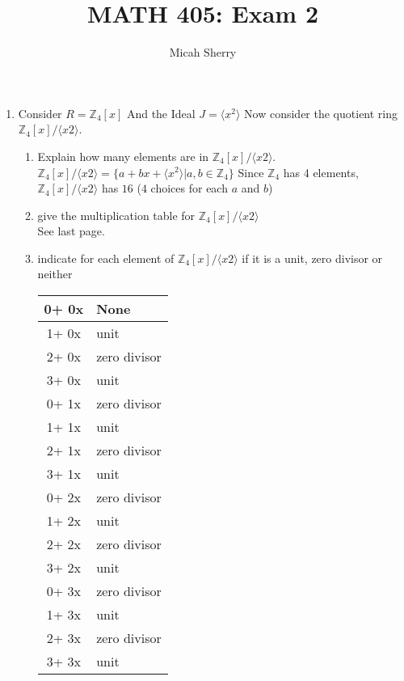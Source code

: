 \documentclass{article}
\title{MATH 405: Exam 2 }
\author{Micah Sherry}
\newcommand{\Z}{\mathbb{Z}}
\begin{document}
	\maketitle
	\begin{enumerate}
		\item Consider $R = \Z_4[x]$ And the Ideal $J= \langle x^2 \rangle$ Now consider the quotient ring $\Z_4[x] / \langle x2 \rangle$.
		\begin{enumerate}
			\item Explain how many elements are in $\Z_4[x] / \langle x2 \rangle$.\\
			$\Z_4[x] / \langle x2 \rangle = \{a+bx+\langle x^2\rangle| a,b \in \Z_4\}$ Since $\Z_4$ has 4 elements, $\Z_4[x] / \langle x2 \rangle$ has $16$ ($4$ choices for each $a$ and $b$)  
			\item  give the multiplication table for $\Z_4[x] / \langle x2 \rangle$\\
				See last page.  
			
			\item  indicate for each element of $\Z_4[x] / \langle x2 \rangle$ if it is a unit, zero divisor or neither 
			\begin{table}[h!] 
				\centering
				\begin{tabular}{|c|l|}
					\hline
					0+ 0x & None \\	\hline
					1+ 0x & unit \\	\hline
					2+ 0x & zero divisor \\	\hline
					3+ 0x & unit \\	\hline
					0+ 1x & zero divisor \\	\hline
					1+ 1x & unit \\	\hline
					2+ 1x & zero divisor \\	\hline
					3+ 1x & unit \\	\hline
					0+ 2x & zero divisor \\	\hline
					1+ 2x & unit \\	\hline
					2+ 2x & zero divisor \\	\hline
					3+ 2x & unit \\	\hline
					0+ 3x & zero divisor \\	\hline
					1+ 3x & unit \\	\hline
					2+ 3x & zero divisor \\	\hline
					3+ 3x & unit \\	\hline
				\end{tabular}
			\end{table}
		\end{enumerate}


\end{enumerate}
\end{document}
